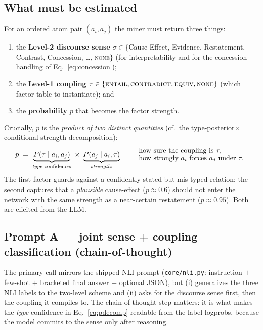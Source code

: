\documentclass[11pt]{article}
\begin{document}
\subsection{What must be estimated}
For an ordered atom pair $(a_i,a_j)$ the miner must return three things:
\begin{enumerate}[leftmargin=*,nosep]
  \item the \textbf{Level-2 discourse sense} $\sigma\in\{$Cause-Effect, Evidence,
        Restatement, Contrast, Concession, \dots, \textsc{none}$\}$ (for interpretability
        and for the concession handling of Eq.~\ref{eq:concession});
  \item the \textbf{Level-1 coupling} $\tau\in\{\textsc{entail},\textsc{contradict},
        \textsc{equiv},\textsc{none}\}$ (which factor table to instantiate); and
  \item the \textbf{probability} $p$ that becomes the factor strength.
\end{enumerate}
Crucially, $p$ is the \emph{product of two distinct quantities}
(cf.\ the type-posterior$\times$conditional-strength decomposition):
\begin{equation}
  p \;=\; \underbrace{P(\tau \mid a_i,a_j)}_{\text{\emph{type} confidence:}}
          \;\times\;
          \underbrace{P(a_j \mid a_i,\tau)}_{\text{\emph{strength}:}}
  \qquad
  \begin{array}{l}\text{how sure the coupling is }\tau,\\[-1pt]
  \text{how strongly $a_i$ forces $a_j$ under }\tau.\end{array}
  \label{eq:pdecomp}
\end{equation}
The first factor guards against a confidently-stated but mis-typed relation; the second
captures that a \emph{plausible} cause-effect ($p{\approx}0.6$) should not enter the network
with the same strength as a near-certain restatement ($p{\approx}0.95$). Both are elicited
from the LLM.

\subsection{Prompt A --- joint sense + coupling classification (chain-of-thought)}
The primary call mirrors the shipped NLI prompt (\texttt{core/nli.py}: instruction $+$
few-shot $+$ bracketed final answer $+$ optional JSON), but (i) generalizes the three NLI
labels to the two-level scheme and (ii) asks for the discourse sense first, then the
coupling it compiles to. The chain-of-thought step matters: it is what makes the
\emph{type} confidence in Eq.~\eqref{eq:pdecomp} readable from the label logprobs, because
the model commits to the sense only after reasoning.
\end{document}
